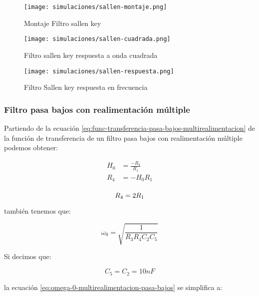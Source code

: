 \begin{figure}[ht]
    \centering
    \texttt{[image: simulaciones/sallen-montaje.png]}
    \caption{Montaje Filtro sallen key}\label{fig:sim-sallen-montaje} 
\end{figure}

\begin{figure}[ht]
    \centering
    \texttt{[image: simulaciones/sallen-cuadrada.png]}
    \caption{Filtro sallen key respuesta a onda cuadrada  }
    \label{fig:sim-sallen-cuadrada} 
\end{figure}

\begin{figure}[ht]
    \centering
    \texttt{[image: simulaciones/sallen-respuesta.png]}
    \caption{Filtro Sallen key respuesta en frecuencia  }
\end{figure}

\FloatBarrier
\subsubsection{Filtro pasa bajos con realimentación múltiple}

Partiendo de la ecuación \ref{eq:func-transferencia-pasa-bajos-multirealimentacion} de la función de transferencia de un filtro pasa bajos con realimentación múltiple podemos obtener:

\begin{align*}
    H_0 &= \frac{-R_4}{R_1} \\
    R_4 &= - H_0 R_1 \\
\end{align*}

\begin{equation}
    R_4 = 2 R_1\\
    \label{eq:r4-multirealimentacion-pasa-bajos}
\end{equation}

también tenemos que: 

\begin{equation}
    \omega_0 = \sqrt{\frac{1}{R_3 R_4 C_2 C_5}}
    \label{eq:omega-0-multirealimentacion-pasa-bajos}
\end{equation}

Si decimos que: 

\begin{equation*}
    \boxed{C_5 = C_2 = 10nF}
\end{equation*}

la ecuación \ref{eq:omega-0-multirealimentacion-pasa-bajos} se simplifica a:

